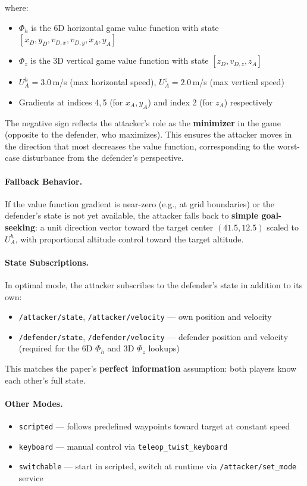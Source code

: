 \documentclass[11pt,a4paper]{article}
\begin{document}
where:
\begin{itemize}[noitemsep]
    \item $\Phi_h$ is the 6D horizontal game value function with state $[x_D, y_D, v_{D,x}, v_{D,y}, x_A, y_A]$
    \item $\Phi_z$ is the 3D vertical game value function with state $[z_D, v_{D,z}, z_A]$
    \item $U_A^h = 3.0$\,m/s (max horizontal speed), $U_A^z = 2.0$\,m/s (max vertical speed)
    \item Gradients at indices 4,\,5 (for $x_A, y_A$) and index 2 (for $z_A$) respectively
\end{itemize}

The negative sign reflects the attacker's role as the \textbf{minimizer} in the game (opposite to the defender, who maximizes). This ensures the attacker moves in the direction that most decreases the value function, corresponding to the worst-case disturbance from the defender's perspective.

\paragraph{Fallback Behavior.}
If the value function gradient is near-zero (e.g., at grid boundaries) or the defender's state is not yet available, the attacker falls back to \textbf{simple goal-seeking}: a unit direction vector toward the target center $(41.5, 12.5)$ scaled to $U_A^h$, with proportional altitude control toward the target altitude.

\paragraph{State Subscriptions.}
In optimal mode, the attacker subscribes to the defender's state in addition to its own:
\begin{itemize}[noitemsep]
    \item \texttt{/attacker/state}, \texttt{/attacker/velocity} --- own position and velocity
    \item \texttt{/defender/state}, \texttt{/defender/velocity} --- defender position and velocity (required for the 6D $\Phi_h$ and 3D $\Phi_z$ lookups)
\end{itemize}
This matches the paper's \textbf{perfect information} assumption: both players know each other's full state.

\paragraph{Other Modes.}
\begin{itemize}[noitemsep]
    \item \texttt{scripted} --- follows predefined waypoints toward target at constant speed
    \item \texttt{keyboard} --- manual control via \texttt{teleop\_twist\_keyboard}
    \item \texttt{switchable} --- start in scripted, switch at runtime via \texttt{/attacker/set\_mode} service
\end{itemize}
\end{document}
